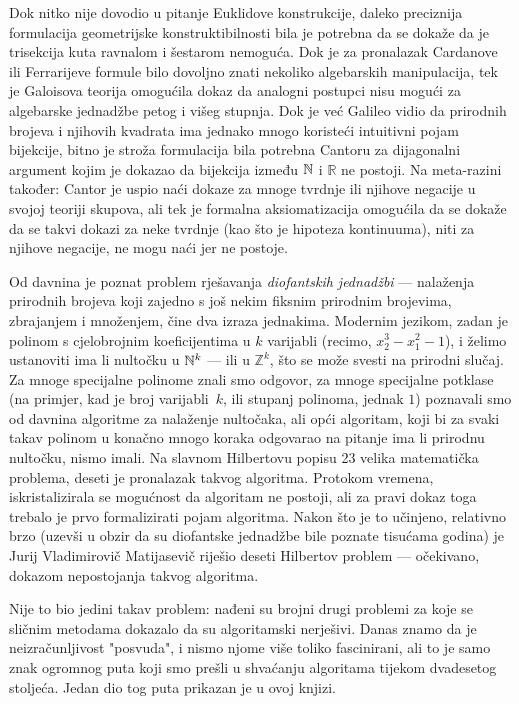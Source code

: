 Dok nitko nije dovodio u pitanje Euklidove konstrukcije, daleko preciznija formulacija geometrijske konstruktibilnosti bila je potrebna da se dokaže da je trisekcija kuta ravnalom i šestarom nemoguća. Dok je za pronalazak Cardanove ili Ferrarijeve formule bilo dovoljno znati nekoliko algebarskih manipulacija, tek je Galoisova teorija omogućila dokaz da analogni postupci nisu mogući za algebarske jednadžbe petog i višeg stupnja. Dok je već Galileo vidio da prirodnih brojeva i njihovih kvadrata ima jednako mnogo koristeći intuitivni pojam bijekcije, bitno je stroža formulacija bila potrebna Cantoru za dijagonalni argument kojim je dokazao da bijekcija između ${\mathbb N}$ i $\mathbb R$ ne postoji. Na meta-razini također: Cantor je uspio naći dokaze za mnoge tvrdnje ili njihove negacije u svojoj teoriji skupova, ali tek je formalna aksiomatizacija omogućila da se dokaže da se takvi dokazi za neke tvrdnje (kao što je hipoteza kontinuuma), niti za njihove negacije, ne mogu naći jer ne postoje.

Od davnina je poznat problem rješavanja \emph{diofantskih jednadžbi} --- nalaženja prirodnih brojeva koji zajedno s još nekim fiksnim prirodnim brojevima, zbrajanjem i množenjem, čine dva izraza jednakima. Modernim jezikom, zadan je polinom s cjelobrojnim koeficijentima u $k$ varijabli (recimo, $x_2^3-x_1^2-1$), i želimo ustanoviti ima li nultočku u ${\mathbb N}^k$ --- ili u $\mathbb Z^k$, što se može svesti na prirodni slučaj. Za mnoge specijalne polinome znali smo odgovor, za mnoge specijalne potklase (na primjer, kad je broj varijabli~$k$, ili stupanj polinoma, jednak $1$) poznavali smo od davnina algoritme za nalaženje nultočaka, ali opći algoritam, koji bi za svaki takav polinom u konačno mnogo koraka odgovarao na pitanje ima li prirodnu nultočku, nismo imali. Na slavnom Hilbertovu popisu 23 velika matematička problema, deseti je pronalazak takvog algoritma. Protokom vremena, iskristalizirala se mogućnost da algoritam ne postoji, ali za pravi dokaz toga trebalo je prvo formalizirati pojam algoritma. Nakon što je to učinjeno, relativno brzo (uzevši u obzir da su diofantske jednadžbe bile poznate tisućama godina) je Jurij Vladimirovič Matijasevič riješio deseti Hilbertov problem --- očekivano, dokazom nepostojanja takvog algoritma.

Nije to bio jedini takav problem: nađeni su brojni drugi problemi za koje se sličnim metodama dokazalo da su algoritamski nerješivi. Danas znamo da je neizračunljivost "posvuda", i nismo njome više toliko fascinirani, ali to je samo znak ogromnog puta koji smo prešli u shvaćanju algoritama tijekom dvadesetog stoljeća. Jedan dio tog puta prikazan je u ovoj knjizi.

